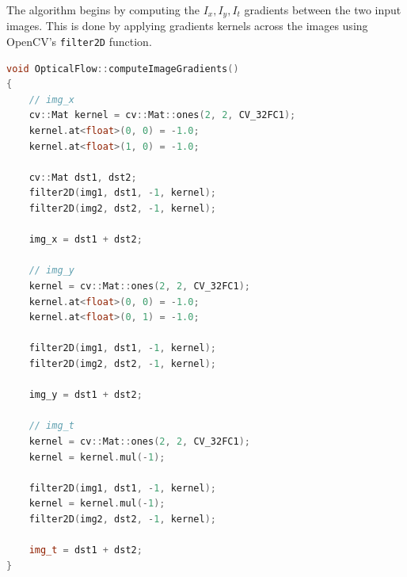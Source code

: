 \documentclass[a4paper,11]{article}
\begin{document}
  The algorithm begins by computing the $I_x, I_y, I_t$ gradients between the two input images. This is done by applying gradients kernels across the images using OpenCV's \texttt{filter2D} function.
  \begin{lstlisting}[language=C++]
void OpticalFlow::computeImageGradients()
{
    // img_x
    cv::Mat kernel = cv::Mat::ones(2, 2, CV_32FC1);
    kernel.at<float>(0, 0) = -1.0;
    kernel.at<float>(1, 0) = -1.0;

    cv::Mat dst1, dst2;
    filter2D(img1, dst1, -1, kernel);
    filter2D(img2, dst2, -1, kernel);

    img_x = dst1 + dst2;

    // img_y
    kernel = cv::Mat::ones(2, 2, CV_32FC1);
    kernel.at<float>(0, 0) = -1.0;
    kernel.at<float>(0, 1) = -1.0;

    filter2D(img1, dst1, -1, kernel);
    filter2D(img2, dst2, -1, kernel);

    img_y = dst1 + dst2;

	// img_t
	kernel = cv::Mat::ones(2, 2, CV_32FC1);
    kernel = kernel.mul(-1);

    filter2D(img1, dst1, -1, kernel);
    kernel = kernel.mul(-1);
    filter2D(img2, dst2, -1, kernel);

    img_t = dst1 + dst2;
}
  \end{lstlisting}
  
\end{document}
